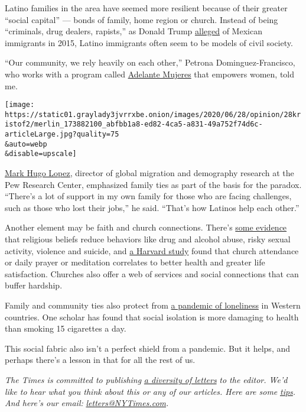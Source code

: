 Latino families in the area have seemed more resilient because of their
greater ``social capital'' --- bonds of family, home region or church.
Instead of being ``criminals, drug dealers, rapists,'' as Donald Trump
\href{https://www.washingtonpost.com/news/fact-checker/wp/2015/07/08/donald-trumps-false-comments-connecting-mexican-immigrants-and-crime/}{alleged}
of Mexican immigrants in 2015, Latino immigrants often seem to be models
of civil society.

``Our community, we rely heavily on each other,'' Petrona
Dominguez-Francisco, who works with a program called
\href{https://www.adelantemujeres.org/}{Adelante Mujeres} that empowers
women, told me.

\texttt{[image: https://static01.graylady3jvrrxbe.onion/images/2020/06/28/opinion/28kristof2/merlin\_173882100\_abfbb1a8-ed82-4ca5-a831-49a752f74d6c-articleLarge.jpg?quality=75\\\&auto=webp\\\&disable=upscale]}

\href{https://www.pewresearch.org/staff/mark-hugo-lopez/}{Mark Hugo
Lopez}, director of global migration and demography research at the Pew
Research Center, emphasized family ties as part of the basis for the
paradox. ``There's a lot of support in my own family for those who are
facing challenges, such as those who lost their jobs,'' he said.
``That's how Latinos help each other.''

Another element may be faith and church connections. There's
\href{https://www.ncbi.nlm.nih.gov/pmc/articles/PMC4286922/}{some
evidence} that religious beliefs reduce behaviors like drug and alcohol
abuse, risky sexual activity, violence and suicide, and
\href{https://www.hsph.harvard.edu/news/press-releases/religious-upbringing-adult-health/}{a
Harvard study} found that church attendance or daily prayer or
meditation correlates to better health and greater life satisfaction.
Churches also offer a web of services and social connections that can
buffer hardship.

Family and community ties also protect from
\href{https://www.nytimes3xbfgragh.onion/2019/11/09/opinion/sunday/britain-loneliness-epidemic.html}{a
pandemic of loneliness} in Western countries. One scholar has found that
social isolation is more damaging to health than smoking 15 cigarettes a
day.

This social fabric also isn't a perfect shield from a pandemic. But it
helps, and perhaps there's a lesson in that for all the rest of us.

\emph{The Times is committed to publishing}
\href{https://www.nytimes3xbfgragh.onion/2019/01/31/opinion/letters/letters-to-editor-new-york-times-women.html}{\emph{a
diversity of letters}} \emph{to the editor. We'd like to hear what you
think about this or any of our articles. Here are some}
\href{https://help.nytimes3xbfgragh.onion/hc/en-us/articles/115014925288-How-to-submit-a-letter-to-the-editor}{\emph{tips}}\emph{.
And here's our email:}
\href{mailto:letters@NYTimes.com}{\emph{letters@NYTimes.com}}\emph{.}

